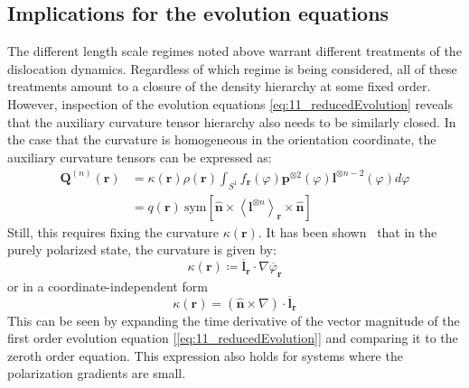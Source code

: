 \subsection{Implications for the evolution equations}
The different length scale regimes noted above warrant different treatments of the dislocation dynamics. Regardless of which regime is being considered, all of these treatments amount to a closure of the density hierarchy at some fixed order. However, inspection of the evolution equations \cref{eq:11_reducedEvolution} reveals that the auxiliary curvature tensor hierarchy also needs to be similarly closed. In the case that the curvature is homogeneous in the orientation coordinate, the auxiliary curvature tensors can be expressed as:
\begin{subequations}
\begin{align}
\mathbf{Q}^{(n)}(\boldsymbol{r}) &= \kappa\left( \boldsymbol{r} \right)\rho\left( \boldsymbol{r} \right)\int_{S^{1}}^{}{f_{\boldsymbol{r}}(\varphi)\boldsymbol{p}^{\otimes2}(\varphi)\boldsymbol{l}^{\otimes n - 2}(\varphi)d\varphi}\\    
&= q\left( \boldsymbol{r} \right)\ \text{sym}\left\lbrack \widehat{\boldsymbol{n}}\times\left\langle \boldsymbol{l}^{\otimes n} \right\rangle_{\boldsymbol{r}} \times \widehat{\boldsymbol{n}} \right\rbrack
\end{align}
\end{subequations}
Still, this requires fixing the curvature \(\kappa\boldsymbol{(r)}\). It has been shown~\cite{Sedlacek2010,Hochrainer2010,zhangContinuumDislocationDynamics2025} that in the purely polarized state, the curvature is given by:
\begin{equation}
\kappa\left( \boldsymbol{r} \right) \coloneqq {\overline{\boldsymbol{l}}}_{\boldsymbol{r}}\cdot\nabla{\overline{\varphi}}_{\boldsymbol{r}}
\end{equation}
or in a coordinate-independent form
\begin{equation}
\kappa\left( \boldsymbol{r} \right)=\left( \hat{\boldsymbol{n}}\times\nabla \right)\cdot{\overline{\boldsymbol{l}}}_{\boldsymbol{r}}
\end{equation}
This can be seen by expanding the time derivative of the vector magnitude of the first order evolution equation {[}\cref{eq:11_reducedEvolution}{]} and comparing it to the zeroth order equation. This expression also holds for systems where the polarization gradients are small.

